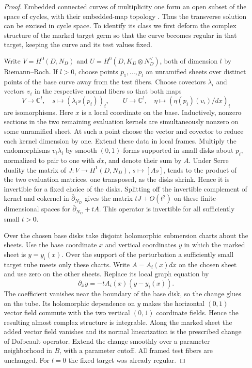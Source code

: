 \begin{proof}
Embedded connected curves of multiplicity one form an open subset
of the space of cycles, with their embedded-map topology
\cite[Proposition~2.21]{DIW}. Thus the transverse solution can be
excised in cycle space. To identify its class we first deform the
complex structure of the marked target germ so that the curve
becomes regular in that target, keeping the curve and its test
values fixed.

Write $V=H^0(D,N_D)$ and $U=H^0(D,K_D\otimes N_D^\vee)$, both
of dimension $l$ by Riemann--Roch. If $l>0$, choose points
$p_1,\dots,p_l$ on unramified sheets over distinct points of the
base curve away from the test fibers. Choose covectors $\lambda_i$
and vectors $v_i$ in the respective normal fibers so that both maps
\[
 V\longrightarrow\mathbb C^l,\quad
       s\longmapsto(\lambda_i s(p_i))_i,\qquad
 U\longrightarrow\mathbb C^l,\quad
       \eta\longmapsto(\eta(p_i)(v_i)/dx)_i
\]
are isomorphisms. Here $x$ is a local coordinate on the base.
Inductively, nonzero sections in the two remaining evaluation
kernels are simultaneously nonzero on some unramified sheet. At
such a point choose the vector and covector to reduce each kernel
dimension by one. Extend these data in local frames. Multiply the
endomorphisms $v_i\lambda_i$ by smooth $(0,1)$-forms supported in
small disks about $p_i$, normalized to pair to one with $dx$, and
denote their sum by $A$. Under Serre duality the matrix of
$J:V\to H^1(D,N_D)$, $s\mapsto[As]$, tends to the product of the
two evaluation matrices, one transposed, as the disks shrink. Hence
it is invertible for a fixed choice of the disks. Splitting off the
invertible complement of kernel and cokernel in $\bar\partial_{N_D}$
gives the matrix $tJ+O(t^2)$ on these finite-dimensional
spaces for $\bar\partial_{N_D}+tA$. This operator is invertible for all
sufficiently small $t>0$.

Over the chosen base disks take disjoint holomorphic submersion
charts about the sheets. Use the base coordinate $x$ and vertical
coordinates $y$ in which the marked sheet is $y=y_i(x)$.
Over the support of the perturbation a sufficiently small target
tube meets only these charts. Write $A=A_i(x)d\bar x$ on the
chosen sheet and use zero on the other sheets. Replace its local
graph equation by
\[
        \partial_{\bar x}y=-tA_i(x)(y-y_i(x)).
\]
The coefficient vanishes near the boundary of the base disk, so
the change glues on the tube. Its holomorphic dependence on $y$
makes the horizontal $(0,1)$ vector field commute with the two
vertical $(0,1)$ coordinate fields. Hence the resulting almost
complex structure is integrable. Along the marked sheet the added vector
field vanishes and its normal linearization is the prescribed
change of Dolbeault operator. Extend the change smoothly over a
parameter neighborhood in $B$, with a parameter cutoff. All framed
test fibers are unchanged. For $l=0$ the fixed target was already
regular.


\end{proof}
